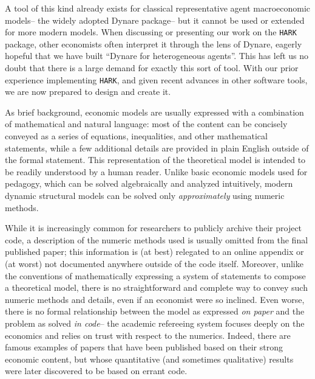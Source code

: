 \documentclass[11pt,pdftex,letterpaper]{article}
\begin{document}
A tool of this kind already exists for classical representative agent macroeconomic models-- the widely adopted Dynare package-- but it cannot be used or extended for more modern models. When discussing or presenting our work on the \texttt{HARK} package, other economists often interpret it through the lens of Dynare, eagerly hopeful that we have built ``Dynare for heterogeneous agents''. This has left us no doubt that there is a large demand for exactly this sort of tool. With our prior experience implementing \texttt{HARK}, and given recent advances in other software tools, we are now prepared to design and create it.

As brief background, economic models are usually expressed with a combination of mathematical and natural language: most of the content can be concisely conveyed as a series of equations, inequalities, and other mathematical statements, while a few additional details are provided in plain English outside of the formal statement. This representation of the theoretical model is intended to be readily understood by a human reader. Unlike basic economic models used for pedagogy, which can be solved algebraically and analyzed intuitively, modern dynamic structural models can be solved only \textit{approximately} using numeric methods.

While it is increasingly common for researchers to publicly archive their project code, a description of the numeric methods used is usually omitted from the final published paper; this information is (at best) relegated to an online appendix or (at worst) not documented anywhere outside of the code itself. Moreover, unlike the conventions of mathematically expressing a system of statements to compose a theoretical model, there is no straightforward and complete way to convey such numeric methods and details, even if an economist were so inclined. Even worse, there is no formal relationship between the model as expressed \textit{on paper} and the problem as solved \textit{in code}-- the academic refereeing system focuses deeply on the economics and relies on trust with respect to the numerics. Indeed, there are famous examples of papers that have been published based on their strong economic content, but whose quantitative (and sometimes qualitative) results were later discovered to be based on errant code.
\end{document}
